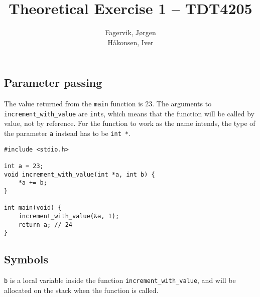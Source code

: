 \documentclass{article}
\author{
    Fagervik, Jørgen\\
    Håkonsen, Iver
}
\title{Theoretical Exercise 1 -- TDT4205}
\begin{document}
\maketitle

\subsection*{Parameter passing}

The value returned from the \texttt{main} function is 23. The arguments to
\texttt{increment\_with\_value} are \texttt{int}s, which means that the function will be called by
value, not by reference. For the function to work as the name intends, the type of the parameter
\texttt{a} instead has to be \texttt{int *}. 

\begin{lstlisting}
#include <stdio.h>

int a = 23;
void increment_with_value(int *a, int b) {
    *a += b;
}

int main(void) {
    increment_with_value(&a, 1);
    return a; // 24
}
\end{lstlisting}


\subsection*{Symbols}

\texttt{b} is a local variable inside the function \texttt{increment\_with\_value}, and will be
allocated on the stack when the function is called.
\end{document}
